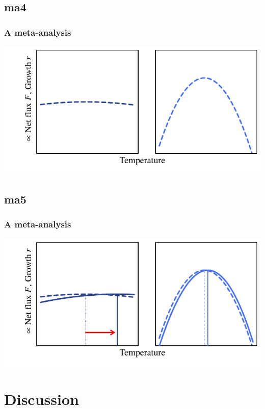 \documentclass{beamer}
\begin{document}
\subsection{ma4}
\begin{frame}
  \frametitle{A meta-analysis}

  \begin{center}
    \includegraphics{figs/delta_tpk_ex.pdf}
  \end{center}
\end{frame}



\subsection{ma5}
\begin{frame}
  \frametitle{A meta-analysis}

  \begin{center}
    \includegraphics{figs/delta_tpk_ex2.pdf}
  \end{center}
\end{frame}





\section{Discussion}
\end{document}
